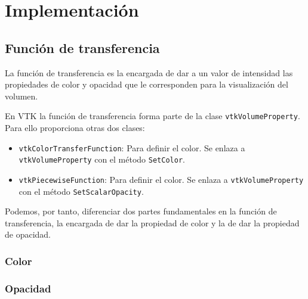 \chapter{Implementación}

\section{Función de transferencia}

La función de transferencia es la encargada de dar a un valor de intensidad las propiedades de color y opacidad que le corresponden para la visualización del volumen.

En VTK la función de transferencia forma parte de la clase \texttt{vtkVolumeProperty}. Para ello proporciona otras dos clases:
\begin{itemize}
	\item \texttt{vtkColorTransferFunction}: Para definir el color. Se enlaza a \texttt{vtkVolumeProperty} con el método \texttt{SetColor}.
	\item \texttt{vtkPiecewiseFunction}: Para definir el color. Se enlaza a \texttt{vtkVolumeProperty} con el método \texttt{SetScalarOpacity}.
\end{itemize}

Podemos, por tanto, diferenciar dos partes fundamentales en la función de transferencia, la encargada de dar la propiedad de color y la de dar la propiedad de opacidad.

\subsection{Color}



\subsection{Opacidad}

